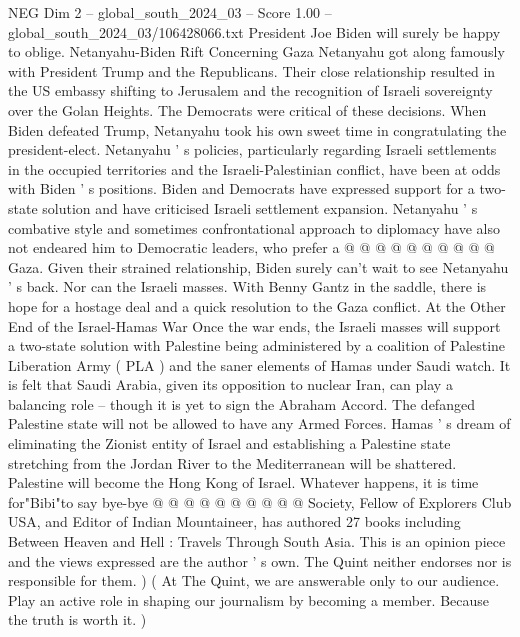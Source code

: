 \begin{textsample}{NEG Dim 2 – global\_south\_2024\_03 – Score 1.00 – global\_south\_2024\_03/106428066.txt}
President Joe Biden will surely be happy to oblige.
Netanyahu-Biden Rift Concerning Gaza Netanyahu got along famously with President Trump and the Republicans.
Their close relationship resulted in the US embassy shifting to Jerusalem and the recognition of Israeli sovereignty over the Golan Heights.
The Democrats were critical of these decisions.
When Biden defeated Trump, Netanyahu took his own sweet time in congratulating the president-elect.
Netanyahu ' s policies, particularly regarding Israeli settlements in the occupied territories and the Israeli-Palestinian conflict, have been at odds with Biden ' s positions.
Biden and Democrats have expressed support for a two-state solution and have criticised Israeli settlement expansion.
Netanyahu ' s combative style and sometimes confrontational approach to diplomacy have also not endeared him to Democratic leaders, who prefer a @ @ @ @ @ @ @ @ @ @ Gaza.
Given their strained relationship, Biden surely can't wait to see Netanyahu ' s back.
Nor can the Israeli masses.
With Benny Gantz in the saddle, there is hope for a hostage deal and a quick resolution to the Gaza conflict.
At the Other End of the Israel-Hamas War Once the war ends, the Israeli masses will support a two-state solution with Palestine being administered by a coalition of Palestine Liberation Army ( PLA ) and the saner elements of Hamas under Saudi watch.
It is felt that Saudi Arabia, given its opposition to nuclear Iran, can play a balancing role -- though it is yet to sign the Abraham Accord.
The defanged Palestine state will not be allowed to have any Armed Forces.
Hamas ' s dream of eliminating the Zionist entity of Israel and establishing a Palestine state stretching from the Jordan River to the Mediterranean will be shattered.
Palestine will become the Hong Kong of Israel.
Whatever happens, it is time for"Bibi"to say bye-bye @ @ @ @ @ @ @ @ @ @ Society, Fellow of Explorers Club USA, and Editor of Indian Mountaineer, has authored 27 books including Between Heaven and Hell : Travels Through South Asia.
This is an opinion piece and the views expressed are the author ' s own.
The Quint neither endorses nor is responsible for them. ) ( At The Quint, we are answerable only to our audience.
Play an active role in shaping our journalism by becoming a member.
Because the truth is worth it. )

\end{textsample}
